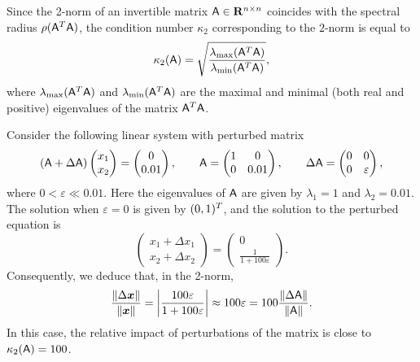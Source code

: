 Since the 2-norm of an invertible matrix $\mat A \in \real^{n \times n}$ coincides with the spectral radius $\rho(\mat A^\t \mat A)$,
the condition number $\kappa_2$ corresponding to the $2$-norm is equal to
\[
    \kappa_2(\mat A) = \sqrt{\frac{\lambda_{\max}(\mat A^\t \mat A)}{\lambda_{\min}(\mat A^\t \mat A)}},
\]
where $\lambda_{\max}(\mat A^\t \mat A)$ and $\lambda_{\min}(\mat A^\t \mat A)$ are the maximal and minimal (both real and positive) eigenvalues of the matrix $\mat A^\t \mat A$.
\begin{example}
    Consider the following linear system
    with perturbed matrix
    \[
        (\mat A + \Delta \mat A)
        \begin{pmatrix}
            x_1 \\
            x_2
        \end{pmatrix}
        = \begin{pmatrix}
            0 \\
            0.01
        \end{pmatrix},
        \qquad
        \mat A
        = \begin{pmatrix}
            1 & 0 \\
            0 & 0.01
        \end{pmatrix},
        \qquad
        \Delta \mat A =
        \begin{pmatrix}
            0 & 0 \\
            0 & \varepsilon
        \end{pmatrix},
    \]
    where $0 < \varepsilon \ll 0.01$.
    Here the eigenvalues of $\mat A$ are given by $\lambda_1 = 1$ and $\lambda_2 = 0.01$.
    The solution when $\varepsilon = 0$ is given by $(0, 1)^\t$,
    and the solution to the perturbed equation is
    \[
        \begin{pmatrix}
        x_1 + \Delta x_1 \\
        x_2 + \Delta x_2
        \end{pmatrix}
        =
        \begin{pmatrix}
            0 \\
            \frac{1}{1 + 100 \varepsilon}
        \end{pmatrix}.
    \]
    Consequently, we deduce that, in the 2-norm,
    \[
        \frac{\norm{\Delta \vect x}}{\norm{\vect x}}
        = \abs*{\frac{100 \varepsilon}{1 + 100 \varepsilon}}
        \approx 100 \varepsilon
        = 100 \frac{\norm{\Delta \mat A}}{\norm{\mat A}}.
    \]
    In this case,
    the relative impact of perturbations of the matrix is close to $\kappa_2(\mat A) = 100$.
\end{example}

